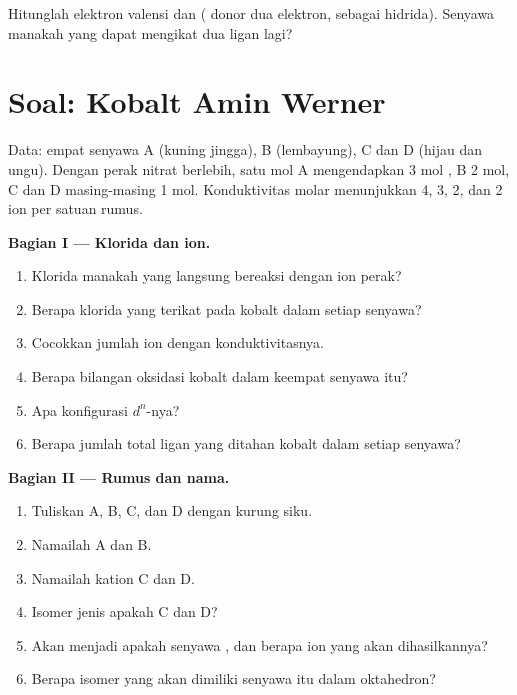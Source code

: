 \begin{exercise}[$\star\star\star$]\label{exo:b2:coordination-complexes:12}
Hitunglah elektron valensi  dan 
( donor dua elektron,  sebagai hidrida). Senyawa manakah
yang dapat mengikat dua ligan lagi?
\end{exercise}

\section{Soal: Kobalt Amin Werner}

\begin{problem}
\label{pb:b2:coordination-complexes:1}
Data: empat senyawa A  (kuning jingga), B 
(lembayung), C dan D  (hijau dan ungu). Dengan perak nitrat
berlebih, satu mol A mengendapkan 3 mol , B 2 mol, C dan D
masing-masing 1 mol. Konduktivitas molar menunjukkan 4, 3, 2, dan 2 ion per
satuan rumus.

\medskip
\noindent\textbf{Bagian I --- Klorida dan ion.}
\begin{enumerate}
  \item Klorida manakah yang langsung bereaksi dengan ion perak?
  \item Berapa klorida yang terikat pada kobalt dalam setiap senyawa?
  \item Cocokkan jumlah ion dengan konduktivitasnya.
  \item Berapa bilangan oksidasi kobalt dalam keempat senyawa itu?
  \item Apa konfigurasi $d^n$-nya?
  \item Berapa jumlah total ligan yang ditahan kobalt dalam setiap senyawa?
\end{enumerate}

\medskip
\noindent\textbf{Bagian II --- Rumus dan nama.}
\begin{enumerate}[resume]
  \item Tuliskan A, B, C, dan D dengan kurung siku.
  \item Namailah A dan B.
  \item Namailah kation C dan D.
  \item Isomer jenis apakah C dan D?
  \item Akan menjadi apakah senyawa , dan berapa ion yang akan
        dihasilkannya?
  \item Berapa isomer yang akan dimiliki senyawa itu dalam oktahedron?
\end{enumerate}


\end{problem}
